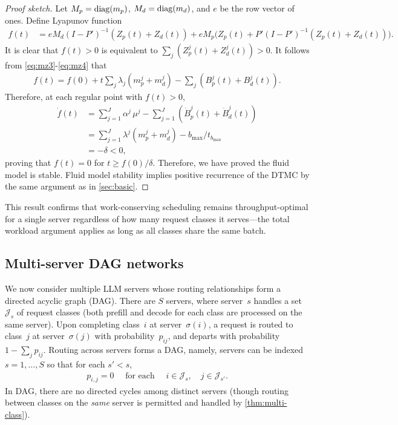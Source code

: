 \documentclass[11pt]{article}
\theoremstyle{plain}
\theoremstyle{definition}
\theoremstyle{remark}
\begin{document}
\begin{proof}[Proof sketch]
Let $M_p={\rm diag}(m_p) $, $M_d={\rm diag}(m_d)$,
and $e$ be the row vector of ones.
Define Lyapunov function
\begin{align*}
   f(t)& =e M_d (I-P')^{-1}(Z_p(t)+Z_d(t)) + e M_p 
   \Big(Z_p(t)+P'(I-P')^{-1} ( Z_p(t)+Z_d(t))\Big).
\end{align*}
It is clear that $f(t)>0$ is equivalent to $\sum_j (Z^j_p(t)+Z^j_d(t))>0$.
It follows from \cref{eq:mz3}-\cref{eq:mz4} that
\begin{align*}
    f(t)=f(0)+t \sum_j \lambda_j (m^j_p+m^j_d) - \sum_j (B_p^j(t)+B_d^j(t)).
\end{align*}
 Therefore, 
at each regular point with $f(t)>0$,
\begin{align*}
  \dot f(t) & = \sum_{j=1}^{J}\alpha^j\,\mu^j - \sum_{j=1}^{J}(\dot B^j_p(t)+\dot B^j_d(t)) \\
  & = \sum_{j=1}^{J}\lambda^j(m^j_p+m^j_d) - b_{\max}/t_{b_{\max}} \\
  & = -\delta < 0,
\end{align*}
proving that $f(t)=0$ for $t\ge f(0)/\delta$. Therefore, we have proved  the fluid model is stable. Fluid model stability implies positive recurrence of the DTMC by the same argument as in \cref{sec:basic}.
\end{proof}

This result confirms that work-conserving scheduling remains throughput-optimal for a single server regardless of how many request classes it serves---the total workload argument applies as long as all classes share the same batch.

\subsection{Multi-server DAG networks}
\label{sec:dag-network}

We now consider multiple LLM servers whose routing relationships form a directed acyclic graph (DAG). There are $S$ servers, where server~$s$ handles a set~$\mathcal{J}_s$ of request classes (both prefill and decode for each class are processed on the same server). Upon completing class~$i$ at server~$\sigma(i)$, a request is routed to class~$j$ at server~$\sigma(j)$ with probability~$p_{ij}$, and departs with probability $1-\sum_j p_{ij}$. Routing across servers forms a DAG, namely, servers can be indexed $s=1,\ldots,S$ so that
for each $s'<s$, 
\begin{align}
    p_{i,j}=0 \quad \text{ for each }\quad i\in \mathcal{J}_s,\quad 
    j\in \mathcal{J}_{s'}.
\end{align}
In DAG, there are no directed cycles among distinct servers (though routing between classes on the \emph{same} server is permitted and handled by \cref{thm:multi-class}).
\end{document}
